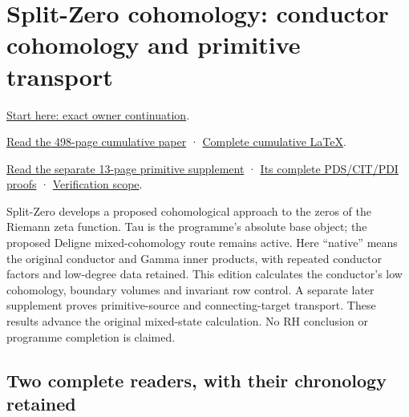 \documentclass[
]{article}
\begin{document}
\section{Split-Zero cohomology: conductor cohomology and primitive
transport}\label{split-zero-cohomology-conductor-cohomology-and-primitive-transport-1}

\href{https://github.com/KokunoYumeto/zeta-function-research-reader/blob/main/workbenches/splitzero-tandem/continuations/20260915-native-conductor-continuation/00_CONTINUE_HERE.md}{Start
here: exact owner continuation}.

\href{https://github.com/KokunoYumeto/zeta-function-research-reader/blob/main/workbenches/splitzero-tandem/continuations/20260915-native-conductor-continuation/15_CURRENT_MIXED_CONTROL_READER.pdf}{Read
the 498-page cumulative paper} ·
\href{https://github.com/KokunoYumeto/zeta-function-research-reader/blob/main/workbenches/splitzero-tandem/continuations/20260915-native-conductor-continuation/14_CURRENT_KERNEL_AND_MULTIPLICITY_PROOFS.tex}{Complete
cumulative LaTeX}.

\href{https://github.com/KokunoYumeto/zeta-function-research-reader/blob/main/workbenches/splitzero-tandem/continuations/20260915-native-conductor-continuation/18_PRIMITIVE_CONNECTING_READER.pdf}{Read
the separate 13-page primitive supplement} ·
\href{https://github.com/KokunoYumeto/zeta-function-research-reader/blob/main/workbenches/splitzero-tandem/continuations/20260915-native-conductor-continuation/17_FULL_PRIMITIVE_CONNECTING_PROOFS.tex}{Its
complete PDS/CIT/PDI proofs} ·
\href{https://github.com/KokunoYumeto/zeta-function-research-reader/blob/main/workbenches/splitzero-tandem/continuations/20260915-native-conductor-continuation/12_VALIDATION.md}{Verification
scope}.

Split-Zero develops a proposed cohomological approach to the zeros of
the Riemann zeta function. Tau is the programme's absolute base object;
the proposed Deligne mixed-cohomology route remains active. Here
``native'' means the original conductor and Gamma inner products, with
repeated conductor factors and low-degree data retained. This edition
calculates the conductor's low cohomology, boundary volumes and
invariant row control. A separate later supplement proves
primitive-source and connecting-target transport. These results advance
the original mixed-state calculation. No RH conclusion or programme
completion is claimed.

\subsection{Two complete readers, with their chronology
retained}\label{two-complete-readers-with-their-chronology-retained}
\end{document}
